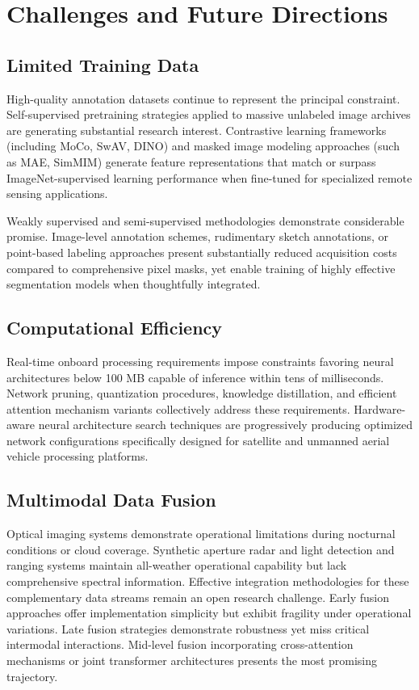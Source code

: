 \documentclass[12pt,a4paper]{article}
\begin{document}
\section{Challenges and Future Directions}
\label{sec:challenges}
\subsection{Limited Training Data}
High-quality annotation datasets continue to represent the principal constraint. Self-supervised pretraining strategies applied to massive unlabeled image archives are generating substantial research interest. Contrastive learning frameworks (including MoCo, SwAV, DINO) and masked image modeling approaches (such as MAE, SimMIM) generate feature representations that match or surpass ImageNet-supervised learning performance when fine-tuned for specialized remote sensing applications.

Weakly supervised and semi-supervised methodologies demonstrate considerable promise. Image-level annotation schemes, rudimentary sketch annotations, or point-based labeling approaches present substantially reduced acquisition costs compared to comprehensive pixel masks, yet enable training of highly effective segmentation models when thoughtfully integrated.

\subsection{Computational Efficiency}
Real-time onboard processing requirements impose constraints favoring neural architectures below 100 MB capable of inference within tens of milliseconds. Network pruning, quantization procedures, knowledge distillation, and efficient attention mechanism variants collectively address these requirements. Hardware-aware neural architecture search techniques are progressively producing optimized network configurations specifically designed for satellite and unmanned aerial vehicle processing platforms.

\subsection{Multimodal Data Fusion}
Optical imaging systems demonstrate operational limitations during nocturnal conditions or cloud coverage. Synthetic aperture radar and light detection and ranging systems maintain all-weather operational capability but lack comprehensive spectral information. Effective integration methodologies for these complementary data streams remain an open research challenge. Early fusion approaches offer implementation simplicity but exhibit fragility under operational variations. Late fusion strategies demonstrate robustness yet miss critical intermodal interactions. Mid-level fusion incorporating cross-attention mechanisms or joint transformer architectures presents the most promising trajectory.
\end{document}
